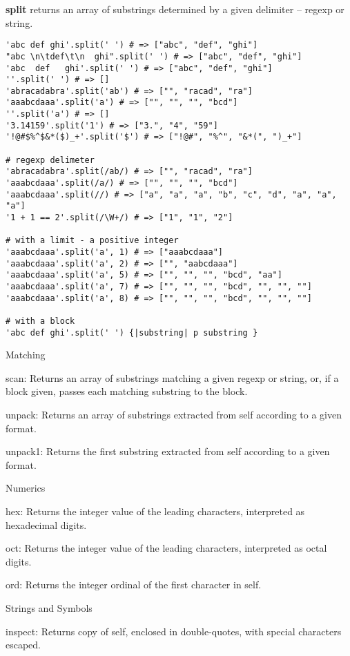 \textbf{split} returns an array of substrings determined by a given delimiter – regexp or string.
\begin{verbatim}
'abc def ghi'.split(' ') # => ["abc", "def", "ghi"]
"abc \n\tdef\t\n  ghi".split(' ') # => ["abc", "def", "ghi"]
'abc  def   ghi'.split(' ') # => ["abc", "def", "ghi"]
''.split(' ') # => []
'abracadabra'.split('ab') # => ["", "racad", "ra"]
'aaabcdaaa'.split('a') # => ["", "", "", "bcd"]
''.split('a') # => []
'3.14159'.split('1') # => ["3.", "4", "59"]
'!@#$%^$&*($)_+'.split('$') # => ["!@#", "%^", "&*(", ")_+"]

# regexp delimeter
'abracadabra'.split(/ab/) # => ["", "racad", "ra"]
'aaabcdaaa'.split(/a/) # => ["", "", "", "bcd"]
'aaabcdaaa'.split(//) # => ["a", "a", "a", "b", "c", "d", "a", "a", "a"]
'1 + 1 == 2'.split(/\W+/) # => ["1", "1", "2"]

# with a limit - a positive integer
'aaabcdaaa'.split('a', 1) # => ["aaabcdaaa"]
'aaabcdaaa'.split('a', 2) # => ["", "aabcdaaa"]
'aaabcdaaa'.split('a', 5) # => ["", "", "", "bcd", "aa"]
'aaabcdaaa'.split('a', 7) # => ["", "", "", "bcd", "", "", ""]
'aaabcdaaa'.split('a', 8) # => ["", "", "", "bcd", "", "", ""]

# with a block
'abc def ghi'.split(' ') {|substring| p substring }
\end{verbatim}

Matching

scan: Returns an array of substrings matching a given regexp or string, or, if a block given, passes each matching substring to the block.

unpack: Returns an array of substrings extracted from self according to a given format.

unpack1: Returns the first substring extracted from self according to a given format.

Numerics

hex: Returns the integer value of the leading characters, interpreted as hexadecimal digits.

oct: Returns the integer value of the leading characters, interpreted as octal digits.

ord: Returns the integer ordinal of the first character in self.



Strings and Symbols

inspect: Returns copy of self, enclosed in double-quotes, with special characters escaped.

